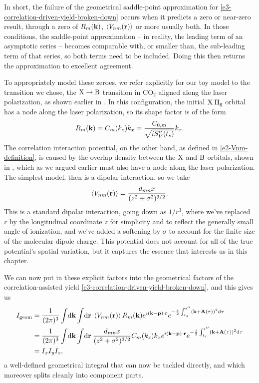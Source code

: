 In short, the failure of the geometrical saddle-point approximation for \eqref{e3-correlation-driven-yield-broken-down} occurs when it predicts a zero or near-zero result, through a zero of $R_m(\vb{k})$, $\left\langle V_{nm}\mathopen{}\left( \vb{r} \right)\mathclose{} \right\rangle$ or more usually both. In those conditions, the saddle-point approximation -- in reality, the leading term of an asymptotic series -- becomes comparable with, or smaller than, the sub-leading term of that series, so both terms need to be included. Doing this then returns the approximation to excellent agreement.



To appropriately model these zeroes, we refer explicitly for our toy model to the transition we chose, the $\mathrm{X}\to\mathrm{B}$ transition in CO$_2$ aligned along the laser polarization, as shown earlier in . In this configuration, the initial $\mathrm{X}\:\Pi_\mathrm{g}$ orbital has a node along the laser polarization, so its shape factor is of the form
\begin{equation}
R_m(\vb{k})=C_m(k_z)k_x = \frac{C_{0,m}}{\sqrt{iS_V''({t_s})}}k_x.
\end{equation}
The correlation interaction potential, on the other hand, as defined in \eqref{e2-Vnm-definition}, is caused by the overlap density between the $\mathrm{X}$ and $\mathrm{B}$ orbitals, shown in , which as we argued earlier must also have a node along the laser polarization. The simplest model, then is a dipolar interaction, so we take
\begin{equation}
\left\langle V_{nm}\mathopen{}\left( \vb{r} \right)\mathclose{} \right\rangle=\frac{d_{mn}x}{(z^2+\sigma^2)^{3/2}}.
\end{equation}
This is a standard dipolar interaction, going down as $1/r^3$, where we've replaced $r$ by the longitudinal coordinate $z$ for simplicity and to reflect the generally small angle of ionization, and we've added a softening by $\sigma$ to account for the finite size of the molecular dipole charge. This potential does not account for all of the true potential's spatial variation, but it captures the essence that interests us in this chapter.


We can now put in these explicit factors into the geometrical factors of the correlation-assisted yield \eqref{e3-correlation-driven-yield-broken-down}, and this gives us
\begin{align}
I_\mathrm{geom}
& =
\frac{1}{(2\pi)^{3}}
\int\!\mathrm{d}\vb{k}
\int\!\mathrm{d}\vb{r} \:
\left\langle V_{nm}\mathopen{}\left( \vb{r} \right)\mathclose{} \right\rangle
R_m(\vb{k})
e^{i\left(\vb{k}-\vb{p}\right)\cdot\vb{r}} 
e^{-\frac{i}{2} \int_{{t_s}}^{t''}\left(\vb{k}+\vb{A}(\tau)\right)^2\mathrm{d}\tau} 
\nonumber \\ & =
\frac{1}{(2\pi)^{3}}
\int\!\mathrm{d}\vb{k}
\int\!\mathrm{d}\vb{r} \:
\frac{d_{mn}x}{(z^2+\sigma^2)^{3/2}}
C_m(k_z)k_x
e^{i\left(\vb{k}-\vb{p}\right)\cdot\vb{r}} 
e^{-\frac{i}{2} \int_{{t_s}}^{t''}\left(\vb{k}+\vb{A}(\tau)\right)^2\mathrm{d}\tau} 
\nonumber \\ & =
I_x I_y I_z
,
\end{align}
a well-defined geometrical integral that can now be tackled directly, and which moreover splits cleanly into component parts.

